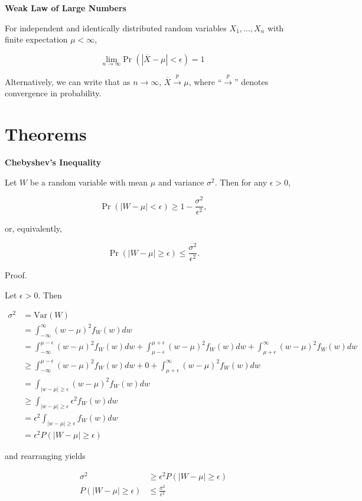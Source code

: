 \documentclass[
  letterpaper,
  DIV=11,
  numbers=noendperiod]{scrreprt}
\begin{document}
\textbf{Weak Law of Large Numbers}

For independent and identically distributed random variables
\(X_1, \dots, X_n\) with finite expectation \(\mu < \infty\),

\[
\underset{n \to \infty}{\text{lim}} \Pr(| \overline{X} - \mu | < \epsilon) = 1
\]

Alternatively, we can write that as \(n \to \infty\),
\(\overline{X} \overset{p}{\to} \mu\), where ``\(\overset{p}{\to}\)''
denotes convergence in probability.

\section{Theorems}\label{theorems-4}

\textbf{Chebyshev's Inequality}

Let \(W\) be a random variable with mean \(\mu\) and variance
\(\sigma^2\). Then for any \(\epsilon > 0\),

\[
\Pr(|W - \mu| < \epsilon) \geq 1 - \frac{\sigma^2}{\epsilon^2},
\]

or, equivalently,

\[
\Pr(|W - \mu| \geq \epsilon) \leq \frac{\sigma^2}{\epsilon^2}.
\]

Proof.

Let \(\epsilon > 0\). Then

\begin{align*}
\sigma^2 & = \text{Var}(W) \\
& = \int_{-\infty}^\infty (w-\mu)^2 f_W(w)dw \\
& = \int_{-\infty}^{\mu - \epsilon} (w-\mu)^2 f_W(w)dw + \int_{\mu - \epsilon}^{\mu + \epsilon} (w-\mu)^2 f_W(w)dw + \int_{\mu + \epsilon}^\infty (w-\mu)^2 f_W(w)dw \\
& \ge \int_{-\infty}^{\mu - \epsilon} (w-\mu)^2 f_W(w)dw + 0  + \int_{\mu + \epsilon}^\infty (w-\mu)^2 f_W(w)dw \\
&= \int_{|w-\mu|\ge \epsilon} (w-\mu)^2 f_W(w)dw \\
& \ge \int_{|w-\mu|\ge \epsilon} \epsilon^2 f_W(w)dw \\
& = \epsilon^2 \int_{|w-\mu|\ge \epsilon} f_W(w)dw\\
& = \epsilon^2 P(|W-\mu| \ge \epsilon)
\end{align*}

and rearranging yields

\begin{align*}
\sigma^2 & \geq \epsilon^2 P(|W-\mu| \ge \epsilon) \\
P(|W-\mu| \geq \epsilon) & \leq \frac{\sigma^2}{\epsilon^2}
\end{align*}
\end{document}
